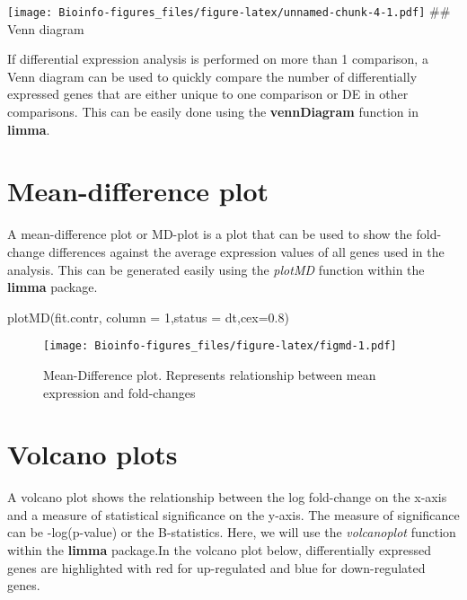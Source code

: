 \documentclass[
  openany]{book}
\newenvironment{Shaded}{\begin{snugshade}}{\end{snugshade}}
\newcommand{\AttributeTok}[1]{\textcolor[rgb]{0.77,0.63,0.00}{#1}}
\newcommand{\DecValTok}[1]{\textcolor[rgb]{0.00,0.00,0.81}{#1}}
\newcommand{\FloatTok}[1]{\textcolor[rgb]{0.00,0.00,0.81}{#1}}
\newcommand{\FunctionTok}[1]{\textcolor[rgb]{0.00,0.00,0.00}{#1}}
\newcommand{\NormalTok}[1]{#1}
\begin{document}
\texttt{[image: Bioinfo-figures\_files/figure-latex/unnamed-chunk-4-1.pdf]}
\#\# Venn diagram

If differential expression analysis is performed on more than 1 comparison, a Venn diagram can be used to quickly compare the number of differentially expressed genes that are either unique to one comparison or DE in other comparisons. This can be easily done using the \textbf{vennDiagram} function in \textbf{limma}.

\hypertarget{mean-difference-plot}{%
\section{Mean-difference plot}\label{mean-difference-plot}}

A mean-difference plot or MD-plot is a plot that can be used to show the fold-change differences against the average expression values of all genes used in the analysis. This can be generated easily using the \emph{plotMD} function within the \textbf{limma} package.

\begin{Shaded}
\begin{Highlighting}[]
\FunctionTok{plotMD}\NormalTok{(fit.contr, }\AttributeTok{column =} \DecValTok{1}\NormalTok{,}\AttributeTok{status =}\NormalTok{ dt,}\AttributeTok{cex=}\FloatTok{0.8}\NormalTok{)}
\end{Highlighting}
\end{Shaded}

\begin{figure}
\centering
\texttt{[image: Bioinfo-figures\_files/figure-latex/figmd-1.pdf]}
\caption{\label{fig:figmd}Mean-Difference plot. Represents relationship between mean expression and fold-changes}
\end{figure}

\hypertarget{volcano-plots}{%
\section{Volcano plots}\label{volcano-plots}}

A volcano plot shows the relationship between the log fold-change on the x-axis and a measure of statistical significance on the y-axis. The measure of significance can be -log(p-value) or the B-statistics. Here, we will use the \emph{volcanoplot} function within the \textbf{limma} package.In the volcano plot below, differentially expressed genes are highlighted with red for up-regulated and blue for down-regulated genes.
\end{document}
